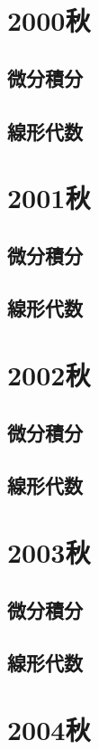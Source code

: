 \section{2000秋}
\subsection{微分積分}


\subsection{線形代数}

\section{2001秋}
\subsection{微分積分}


\subsection{線形代数}

\section{2002秋}
\subsection{微分積分}


\subsection{線形代数}

\section{2003秋}
\subsection{微分積分}


\subsection{線形代数}

\section{2004秋}
